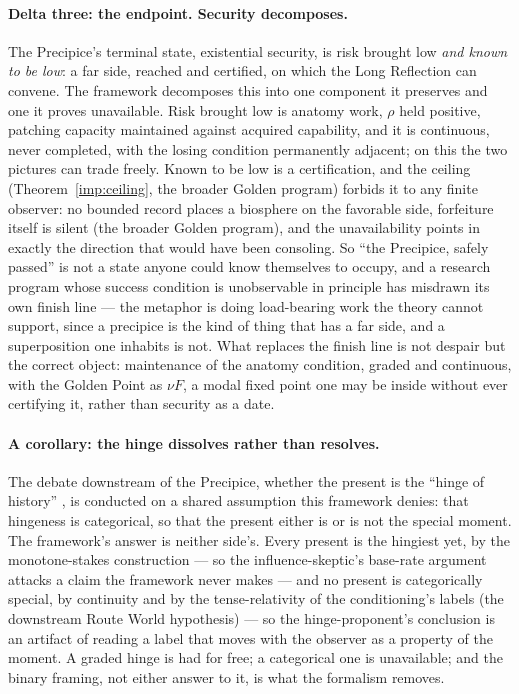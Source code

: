 \paragraph{Delta three: the endpoint. Security decomposes.} The
Precipice's terminal state, existential security, is risk
brought low \emph{and known to be low}: a far side, reached and
certified, on which the Long Reflection can convene. The framework
decomposes this into one component it preserves and one it proves
unavailable. Risk brought low is anatomy work, $\rho$ held
positive, patching capacity maintained against acquired capability, and it is continuous, never completed, with the losing condition
permanently adjacent; on this the two pictures can trade freely.
Known to be low is a certification, and the ceiling
(Theorem~\ref{imp:ceiling}, the broader Golden program)
forbids it to any finite observer: no bounded record places a
biosphere on the favorable side, forfeiture itself is silent
(the broader Golden program), and the unavailability points in
exactly the direction that would have been consoling. So ``the
Precipice, safely passed'' is not a state anyone could know themselves
to occupy, and a research program whose success condition is
unobservable in principle has misdrawn its own finish line --- the
metaphor is doing load-bearing work the theory cannot support, since a
precipice is the kind of thing that has a far side, and a
superposition one inhabits is not. What replaces the finish line is
not despair but the correct object: maintenance of the anatomy
condition, graded and continuous, with the Golden Point as
$\nu F$, a modal fixed point one may be inside without ever
certifying it, rather than security as a date.

\paragraph{A corollary: the hinge dissolves rather than resolves.}
The debate downstream of the Precipice, whether the present is the
``hinge of history'' \cite{MacAskill22,GM21}, is conducted on a
shared assumption this framework denies: that hingeness is
categorical, so that the present either is or is not the special
moment. The framework's answer is neither side's. Every present is the
hingiest yet, by the monotone-stakes construction --- so the
influence-skeptic's base-rate argument attacks a claim the framework
never makes --- and no present is categorically special, by
continuity and by the tense-relativity of the conditioning's labels
(the downstream Route World hypothesis) --- so the hinge-proponent's
conclusion is an artifact of reading a label that moves with the
observer as a property of the moment. A graded hinge is had for free;
a categorical one is unavailable; and the binary framing, not either
answer to it, is what the formalism removes.

